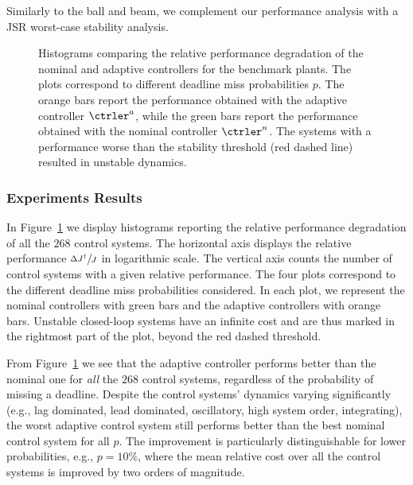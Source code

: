 Similarly to the ball and beam, we complement our performance analysis with a JSR worst-case stability analysis.

\begin{figure}
    \centering
    
    \caption{Histograms comparing the relative performance degradation of the nominal and adaptive controllers for the benchmark plants.
    The plots correspond to different deadline miss probabilities $p$.
    The orange bars report the performance obtained with the adaptive controller $\ctrler^a$, while the green bars report the performance obtained with the nominal controller $\ctrler^n$.
    The systems with a performance worse than the stability threshold (red dashed line) resulted in unstable dynamics.}
    \label{fig:aggregate}
\end{figure}

\subsubsection*{Experiments Results}
In Figure~\ref{fig:aggregate} we display histograms reporting the relative performance degradation of all the $268$ control systems.
The horizontal axis displays the relative performance $\sfrac{\Delta J^\dagger}{J}$ in logarithmic scale. 
The vertical axis counts the number of control systems with a given relative performance.
The four plots correspond to the different deadline miss probabilities considered.
In each plot, we represent the nominal controllers with green bars and the adaptive controllers with orange bars.
Unstable closed-loop systems have an infinite cost and are thus marked in the rightmost part of the plot, beyond the red dashed threshold.

From Figure~\ref{fig:aggregate} we see that the adaptive controller performs better than the nominal one for \emph{all} the $268$ control systems, regardless of the probability of missing a deadline.
Despite the control systems' dynamics varying significantly (e.g., lag dominated, lead dominated, oscillatory, high system order, integrating), the worst adaptive control system still performs better than the best nominal control system for all $p$.
The improvement is particularly distinguishable for lower probabilities, e.g., $p=10\%$, where the mean relative cost over all the control systems is improved by two orders of magnitude.


